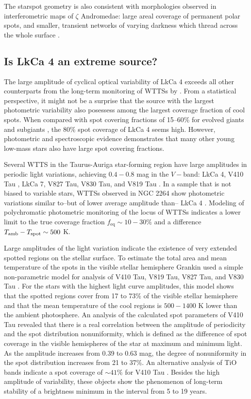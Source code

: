\documentclass[twocolumn]{emulateapj}%
\newcommand{\name}{LkCa 4 }
\begin{document}
The starspot geometry is also consistent with morphologies observed in interferometric maps of $\zeta$ Andromedae: large areal coverage of permanent polar spots, and smaller, transient networks of varying darkness which thread across the whole surface \citep{roettenbacher16}.


\subsection{Is \name an extreme source?}
The large amplitude of cyclical optical variability of LkCa 4 exceeds all other counterparts from the long-term monitoring of WTTSs by \citet{grankin08}.  From a statistical perspective, it might not be a surprise that the source with the largest photometric variability also posessess among the largest coverage fraction of cool spots.  When compared with spot covering fractions of 15--60\% for evolved giants and subgiants \citep{chugainov76,berdyugina05}, the 80\% spot coverage of LkCa 4 seems high.  However, photometric and spectroscopic evidence demonstrates that many other young low-mass stars also have large spot covering fractions.

Several WTTS in the Taurus-Auriga star-forming region have large amplitudes in periodic light variations, achieving $0.4-0.8$ mag in the $V-$band: LkCa 4, V410 Tau \citep{herbst89}, LkCa 7, V827 Tau, V830 Tau, and V819 Tau \citep{grankin08}.  In a sample that is not biased to variable stars, WTTSs observed in NGC 2264 show photometric variations similar to--but of lower average amplitude than-- LkCa 4 \citep{cody14,venuti15}.  Modeling of polychromatic photometric monitoring of the locus of WTTSs indicates a lower limit to the true coverage fraction $f_{\mathrm{eq}}\sim10-30\%$ and a difference $T_\textrm{amb}-T_\textrm{spot}\sim500$ K. 

Large amplitudes of the light variation indicate the existence of very extended spotted regions on the stellar surface. To estimate the total area and mean temperature of the spots in the visible stellar hemisphere Grankin used a simple non-parametric model for analysis of V410 Tau, V819 Tau, V827 Tau, and V830 Tau \citep{grankin98,grankin99}.  For the stars with the highest light curve amplitudes, this model shows that the spotted regions cover from 17 to 73\% of the visible stellar hemisphere and that the mean temperature of the cool regions is $500-1400$ K lower than the ambient photosphere.  An analysis of the calculated spot parameters of V410 Tau revealed that there is a real correlation between the amplitude of periodicity and the spot distribution
nonuniformity, which is defined as the difference of spot coverage in the visible hemispheres of the star at maximum and minimum light. As the amplitude increases from 0.39 to 0.63 mag, the degree of nonuniformity in the spot distribution increases from 21 to 37\%.  An alternative analysis of TiO bands indicate a spot coverage of $\sim 41$\% for V410 Tau \citep{petrov94}.  Besides the high amplitude of variability, these objects show the phenomenon of long-term stability of a brightness minimum in the interval from 5 to 19 years.
\end{document}
